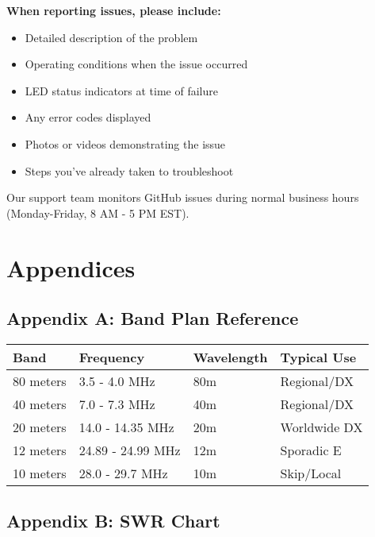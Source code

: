 \documentclass[11pt,a4paper]{article}
\begin{document}
\textbf{When reporting issues, please include:}
\begin{itemize}
    \item Detailed description of the problem
    \item Operating conditions when the issue occurred
    \item LED status indicators at time of failure
    \item Any error codes displayed
    \item Photos or videos demonstrating the issue
    \item Steps you've already taken to troubleshoot
\end{itemize}

Our support team monitors GitHub issues during normal business hours (Monday-Friday, 8 AM - 5 PM EST).

\section{Appendices}

\subsection{Appendix A: Band Plan Reference}
\begin{center}
\small
\begin{tabular}{|l|l|l|l|}
\hline
\textbf{Band} & \textbf{Frequency} & \textbf{Wavelength} & \textbf{Typical Use} \\
\hline
80 meters & 3.5 - 4.0 MHz & 80m & Regional/DX \\
40 meters & 7.0 - 7.3 MHz & 40m & Regional/DX \\
20 meters & 14.0 - 14.35 MHz & 20m & Worldwide DX \\
12 meters & 24.89 - 24.99 MHz & 12m & Sporadic E \\
10 meters & 28.0 - 29.7 MHz & 10m & Skip/Local \\
\hline
\end{tabular}
\end{center}

\subsection{Appendix B: SWR Chart}
\begin{center}
\end{center}
\end{document}
